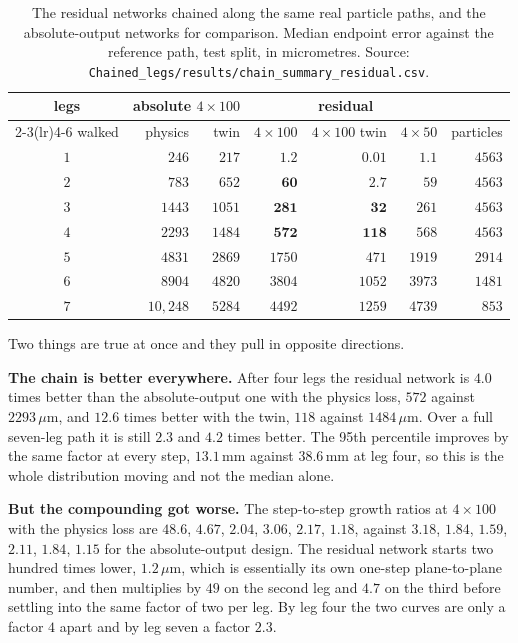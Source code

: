 \documentclass[11pt,a4paper]{article}
\newcommand{\um}{\ensuremath{\,\mu\mathrm{m}}}
\newcommand{\mm}{\ensuremath{\,\mathrm{mm}}}
\begin{document}
\begin{table}[tbp]
  \centering
  \caption{The residual networks chained along the same real particle paths, and
  the absolute-output networks for comparison. Median endpoint error against the
  reference path, test split, in micrometres. Source:
  \texttt{Chained\_legs/results/chain\_summary\_residual.csv}.}
  \label{tab:chains-residual}
  \footnotesize
  \setlength{\tabcolsep}{3pt}
  \begin{tabular}{crrrrrr}
    \toprule
    legs & \multicolumn{2}{c}{absolute $4{\times}100$}
         & \multicolumn{3}{c}{residual} & \\
    \cmidrule(lr){2-3}\cmidrule(lr){4-6}
    walked & physics & twin & $4{\times}100$ & $4{\times}100$ twin
           & $4{\times}50$ & particles \\
    \midrule
    $1$ & $246$      & $217$  & $\mathbf{1.2}$  & $\mathbf{0.01}$ & $1.1$  & $4563$ \\
    $2$ & $783$      & $652$  & $\mathbf{60}$   & $\mathbf{2.7}$  & $59$   & $4563$ \\
    $3$ & $1443$     & $1051$ & $\mathbf{281}$  & $\mathbf{32}$   & $261$  & $4563$ \\
    $4$ & $2293$     & $1484$ & $\mathbf{572}$  & $\mathbf{118}$  & $568$  & $4563$ \\
    $5$ & $4831$     & $2869$ & $1750$          & $471$           & $1919$ & $2914$ \\
    $6$ & $8904$     & $4820$ & $3804$          & $1052$          & $3973$ & $1481$ \\
    $7$ & $10{,}248$ & $5284$ & $4492$          & $1259$          & $4739$ & $853$ \\
    \bottomrule
  \end{tabular}
\end{table}

Two things are true at once and they pull in opposite directions.

\textbf{The chain is better everywhere.} After four legs the residual network is
$4.0$ times better than the absolute-output one with the physics loss, $572$
against $2293\um$, and $12.6$ times better with the twin, $118$ against
$1484\um$. Over a full seven-leg path it is still $2.3$ and $4.2$ times better.
The 95th percentile improves by the same factor at every step, $13.1\mm$ against
$38.6\mm$ at leg four, so this is the whole distribution moving and not the
median alone.

\textbf{But the compounding got worse.} The step-to-step growth ratios at
$4 \times 100$ with the physics loss are $48.6$, $4.67$, $2.04$, $3.06$, $2.17$,
$1.18$, against $3.18$, $1.84$, $1.59$, $2.11$, $1.84$, $1.15$ for the
absolute-output design. The residual network starts two hundred times lower,
$1.2\um$, which is essentially its own one-step plane-to-plane number, and then
multiplies by $49$ on the second leg and $4.7$ on the third before settling into
the same factor of two per leg. By leg four the two curves are only a factor $4$
apart and by leg seven a factor $2.3$.
\end{document}
